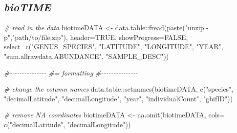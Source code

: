 \documentclass[
]{article}
\newenvironment{Shaded}{\begin{snugshade}}{\end{snugshade}}
\newcommand{\AttributeTok}[1]{\textcolor[rgb]{0.77,0.63,0.00}{#1}}
\newcommand{\CommentTok}[1]{\textcolor[rgb]{0.56,0.35,0.01}{\textit{#1}}}
\newcommand{\ConstantTok}[1]{\textcolor[rgb]{0.00,0.00,0.00}{#1}}
\newcommand{\FunctionTok}[1]{\textcolor[rgb]{0.00,0.00,0.00}{#1}}
\newcommand{\NormalTok}[1]{#1}
\newcommand{\OtherTok}[1]{\textcolor[rgb]{0.56,0.35,0.01}{#1}}
\newcommand{\SpecialCharTok}[1]{\textcolor[rgb]{0.00,0.00,0.00}{#1}}
\newcommand{\StringTok}[1]{\textcolor[rgb]{0.31,0.60,0.02}{#1}}
\begin{document}
\hypertarget{biotime}{%
\subsection{\texorpdfstring{\emph{bioTIME}}{bioTIME}}\label{biotime}}

\begin{Shaded}
\begin{Highlighting}[]

\CommentTok{\# read in the data}
\NormalTok{biotimeDATA  }\OtherTok{\textless{}{-}}\NormalTok{ data.table}\SpecialCharTok{::}\FunctionTok{fread}\NormalTok{(}\FunctionTok{paste}\NormalTok{(}\StringTok{"unzip {-}p"}\NormalTok{,}\StringTok{"path/to/file.zip"}\NormalTok{),}
                                  \AttributeTok{header=}\ConstantTok{TRUE}\NormalTok{,}
                                  \AttributeTok{showProgress=}\ConstantTok{FALSE}\NormalTok{,}
                                  \AttributeTok{select=}\FunctionTok{c}\NormalTok{(}\StringTok{"GENUS\_SPECIES"}\NormalTok{,}
                                           \StringTok{"LATITUDE"}\NormalTok{,}
                                           \StringTok{"LONGITUDE"}\NormalTok{,}
                                           \StringTok{"YEAR"}\NormalTok{,}
                                           \StringTok{"sum.allrawdata.ABUNDANCE"}\NormalTok{,}
                                           \StringTok{"SAMPLE\_DESC"}\NormalTok{))}

\CommentTok{\#{-}{-}{-}{-}{-}{-}{-}{-}{-}{-}{-}{-}{-}{-}{-}}
\CommentTok{\#= formatting}
\CommentTok{\#{-}{-}{-}{-}{-}{-}{-}{-}{-}{-}{-}{-}{-}{-}{-}}

\CommentTok{\# change the column names}
\NormalTok{data.table}\SpecialCharTok{::}\FunctionTok{setnames}\NormalTok{(biotimeDATA, }\FunctionTok{c}\NormalTok{(}\StringTok{"species"}\NormalTok{,}
                                    \StringTok{"decimalLatitude"}\NormalTok{,}
                                    \StringTok{"decimalLongitude"}\NormalTok{,}
                                    \StringTok{"year"}\NormalTok{,}
                                    \StringTok{"individualCount"}\NormalTok{,}
                                    \StringTok{"gbifID"}\NormalTok{))}

\CommentTok{\# remove NA coordinates}
\NormalTok{biotimeDATA  }\OtherTok{\textless{}{-}} \FunctionTok{na.omit}\NormalTok{(biotimeDATA, }\AttributeTok{cols=} \FunctionTok{c}\NormalTok{(}\StringTok{"decimalLatitude"}\NormalTok{, }\StringTok{"decimalLongitude"}\NormalTok{))}


\end{Highlighting}
\end{Shaded}
\end{document}
